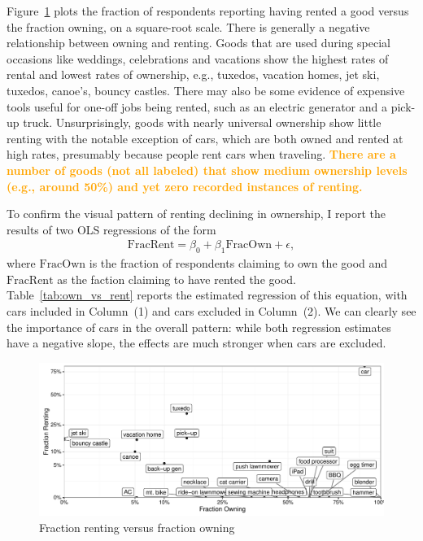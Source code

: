 \documentclass[11pt]{article}
\newcommand{\important}[1]{\textcolor{orange}{\textbf{#1}}}
\newcommand{\important}[1]{#1}
\begin{document}
Figure~\ref{fig:scatter} plots the fraction of respondents reporting having rented a good versus the fraction owning, on a square-root scale.  
There is generally a negative relationship between owning and renting. 
Goods that are used during special occasions like weddings, celebrations and vacations show the highest rates of rental and lowest rates of ownership, e.g., tuxedos, vacation homes, jet ski, tuxedos, canoe's, bouncy castles. 
There may also be some evidence of expensive tools useful for one-off jobs being rented, such as an electric generator and a pick-up truck. 
Unsurprisingly, goods with nearly universal ownership show little renting with the notable exception of cars, which are both owned and rented at high rates, presumably because people rent cars when traveling.  
\important{There are a number of goods (not all labeled) that show medium ownership levels (e.g., around 50\%) and yet zero recorded instances of renting.} 

To confirm the visual pattern of renting declining in ownership, I report the results of two OLS regressions of the form
\begin{align}
\mbox{FracRent} = \beta_0 + \beta_1 \mbox{FracOwn} + \epsilon,  
\end{align} 
where $\mbox{FracOwn}$ is the fraction of respondents claiming to own the good and $\mbox{FracRent}$ as the faction claiming to have rented the good. 
Table~\ref{tab:own_vs_rent} reports the estimated regression of this equation, with cars included in Column~(1) and cars excluded in Column~(2). 
We can clearly see the importance of cars in the overall pattern: while both regression estimates have a negative slope, the effects are much stronger when cars are excluded. 

\begin{figure}
\centering 
\caption{Fraction renting versus fraction owning \label{fig:scatter} }
\begin{minipage}{0.60 \linewidth}
\includegraphics[width = \linewidth]{./plots/scatter_rent_v_own.pdf} 
\end{minipage} 
\end{figure} 
\end{document}

